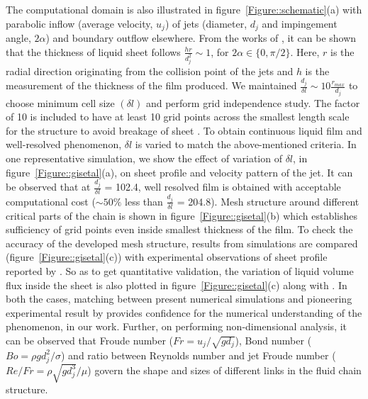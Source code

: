 \documentclass{jfm}
\begin{document}
The computational domain is also illustrated in figure~\ref{Figure::schematic}(a) with parabolic inflow (average velocity, $u_j$) of jets (diameter, $d_j$ and impingement angle, $2\alpha$) and boundary outflow elsewhere. From the works of \cite{choo2001parametric}, it can be shown that the thickness of liquid sheet follows $\frac{hr}{d_j^2} \sim 1$, for $2\alpha \in \{0,\pi/2\}$.  Here, $r$ is the radial direction originating from the collision point of the jets and $h$ is the measurement of the thickness of the film produced. We maintained $\frac{d_j}{\delta l} \sim 10\frac{r_{max}}{d_j}$ to choose minimum cell size $\left(\delta l\right)$ and perform grid independence study. The factor of 10 is included to have at least 10 grid points \citep{ling2015multiscale} across the smallest length scale for the structure to avoid breakage of sheet \citep{chen2013high}. To obtain continuous liquid film and well-resolved phenomenon, $\delta l$ is varied to match the above-mentioned criteria. In one representative simulation, we show the effect of variation of $\delta l$, in figure~\ref{Figure::gisetal}(a), on sheet profile and velocity pattern of the jet. It can be observed that at $\frac{d_j}{\delta l}$ = 102.4, well resolved film is obtained with acceptable computational cost ($\sim 50\%$ less than $\frac{d_j}{\delta l}$ = 204.8). Mesh structure around different critical parts of the chain is shown in figure~\ref{Figure::gisetal}(b) which establishes sufficiency of grid points even inside smallest thickness of the film. To check the accuracy of the developed mesh structure, results from simulations are compared (figure~\ref{Figure::gisetal}(c)) with experimental observations of sheet profile reported by \cite{bush2004collision}. So as to get quantitative validation, the variation of liquid volume flux inside the sheet is also plotted in figure~\ref{Figure::gisetal}(c) along with \cite{bush2004collision}. In both the cases, matching between present numerical simulations and pioneering experimental result by \cite{bush2004collision} provides confidence for the numerical understanding of the phenomenon, in our work. Further, on performing non-dimensional analysis, it can be observed that Froude number ($Fr = u_j/\sqrt{gd_j}$), Bond number ($Bo = \rho gd_j^2/\sigma$) and ratio between Reynolds number and jet Froude number ($Re/Fr = \rho\sqrt{gd_j^3}/\mu$) govern the shape and sizes of different links in the fluid chain structure.
\end{document}
